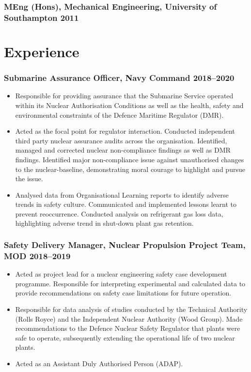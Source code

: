 \documentclass[a4paper, oneside, final, 11pt]{scrartcl} %
\begin{document}
\subsubsection*{MEng (Hons), \textnormal{Mechanical Engineering, University of Southampton} \hfill 2011} 

\medskip
\bigskip


\section{Experience}

\subsubsection*{Submarine Assurance Officer, Navy Command \hfill 2018--2020}  
\normalfont
\begin{itemize}
	\item Responsible for providing
assurance that the Submarine Service operated within its Nuclear Authorisation Conditions as well as the health, safety and environmental constraints of the Defence Maritime Regulator (DMR).
	\item Acted as the focal point for regulator interaction. Conducted independent third party nuclear assurance audits across the organisation. Identified, managed and corrected nuclear non-compliance findings as well as DMR findings. Identified major non-compliance issue against unauthorised changes to the nuclear-baseline, demonstrating moral courage to highlight and pursue the issue. 
	\item Analysed data from Organisational Learning reports to identify adverse trends in safety culture. Communicated and implemented lessons learnt to prevent reoccurrence. Conducted analysis on refrigerant gas loss data, highlighting adverse trend in shut-down plant gas retention. 
\end{itemize}


\subsubsection*{Safety Delivery Manager,  Nuclear Propulsion Project Team, MOD \hfill 2018--2019}  
\normalfont
\begin{itemize}
	\item Acted as project lead for a nuclear engineering safety case development programme.  Responsible for interpreting experimental and calculated data to provide recommendations on safety case limitations for future operation.
	\item Responsible for data analysis of studies conducted by the Technical Authority (Rolls Royce) and the Independent Nuclear Authority (Wood Group). Made recommendations to the Defence Nuclear Safety Regulator that plants were safe to operate,  subsequently extending the operational life of two nuclear plants.
	\item Acted as an Assistant Duly Authorised Person (ADAP). 
\end{itemize}
\end{document}
